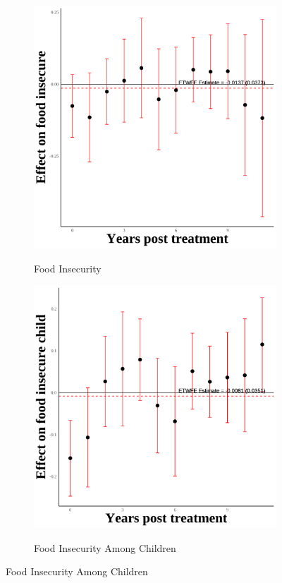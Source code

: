 \documentclass[12pt,english]{article}
\begin{document}
\begin{figure}[H]
  \begin{subfigure}[b]{0.3\textwidth}
    \centering
    \caption{Food Insecurity}
    \includegraphics[width=\linewidth]{figures/plot40-food_insecure_event_study-secgen-hw.png}
    \label{fig:food-insecure-secgen-hw}
  \end{subfigure}
  \hfill
  \begin{subfigure}[b]{0.3\textwidth}
    \centering
    \caption{Food Insecurity Among Children}
    \includegraphics[width=\linewidth]{figures/plot41-food_insecure_child_event_study-secgen-hw.png}
    \label{fig:food-insecure-child-secgen-hw}
  \end{subfigure}

\end{figure}
\end{document}

